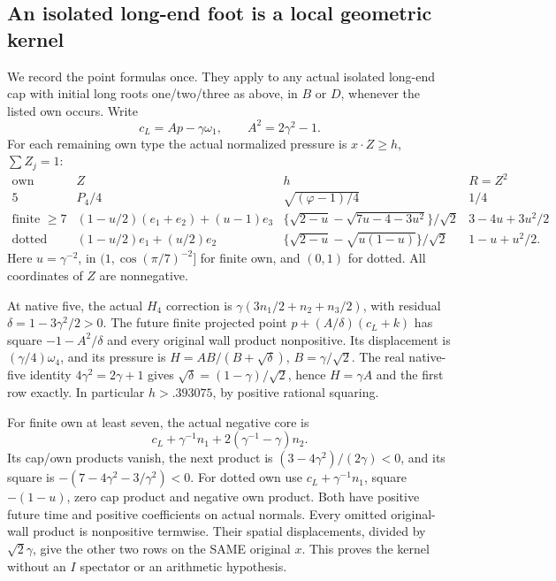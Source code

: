 \documentclass[11pt]{article}
\theoremstyle{definition}
\theoremstyle{remark}
\begin{document}
\subsection{An isolated long-end foot is a local geometric kernel}
\label{app:exact19:longfeet}

We record the point formulas once.
They apply to any actual isolated
long-end cap with initial long roots
one/two/three as above, in \(B\) or
\(D\), whenever the listed own occurs.
Write
\[
                  c_L=Ap-\gamma\omega_1,\qquad A^2=2\gamma^2-1 .
\]
For each remaining own type the
actual normalized pressure is
\(x\cdot Z\ge h\), \(\sum Z_j=1\):
\[
\begin{array}{c|c|c|c}
 \text{own}&Z&h&R=Z^2\\ \hline
 5&P_4/4&\sqrt{(\varphi-1)/4}&1/4\\
 \text{finite }\ge7&
 (1-u/2)(e_1+e_2)+(u-1)e_3&
 \{\sqrt{2-u}-\sqrt{7u-4-3u^2}\}/\sqrt2&
                   3-4u+3u^2/2\\
 \text{dotted}&(1-u/2)e_1+(u/2)e_2&
 \{\sqrt{2-u}-\sqrt{u(1-u)}\}/\sqrt2&
                   1-u+u^2/2 .
\end{array}
\tag{B19headfeet}\label{app:exact19:eq:longfeet}
\]
Here \(u=\gamma^{-2}\), in
\((1,\cos(\pi/7)^{-2}]\) for finite
own, and \((0,1)\) for dotted.
All coordinates of \(Z\) are
nonnegative.

At native five, the actual \(H_4\)
correction is
\(\gamma(3n_1/2+n_2+n_3/2)\),
with residual
\(\delta=1-3\gamma^2/2>0\).
The future finite projected point
\(p+(A/\delta)(c_L+k)\) has square
\(-1-A^2/\delta\) and every original
wall product nonpositive.
Its displacement is
\((\gamma/4)\omega_4\), and its
pressure is \(H=AB/(B+\sqrt\delta)\),
\(B=\gamma/\sqrt2\).
The real native-five identity
\(4\gamma^2=2\gamma+1\) gives
\(\sqrt\delta=(1-\gamma)/\sqrt2\),
hence \(H=\gamma A\) and the first
row exactly.
In particular \(h>.393075\),
by positive rational squaring.

For finite own at least seven,
the actual negative core is
\[
 c_L+\gamma^{-1}n_1+2(\gamma^{-1}-\gamma)n_2 .
\]
Its cap/own products vanish, the
next product is
\((3-4\gamma^2)/(2\gamma)<0\),
and its square is
\(-(7-4\gamma^2-3/\gamma^2)<0\).
For dotted own use
\(c_L+\gamma^{-1}n_1\), square
\(-(1-u)\), zero cap product and
negative own product.
Both have positive future time
and positive coefficients on actual
normals.
Every omitted original-wall product
is nonpositive termwise.
Their spatial displacements, divided
by \(\sqrt2\gamma\), give the other
two rows on the SAME original \(x\).
This proves the kernel without an
\(I\) spectator or an arithmetic
hypothesis.
\end{document}
